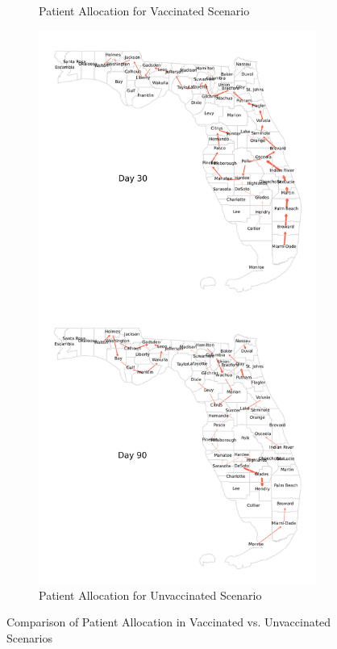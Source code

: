 \documentclass{article}
\begin{document}
\begin{figure}
\begin{subfigure}{0.445\linewidth}
        \caption{Patient Allocation for Vaccinated Scenario}\label{fig:patientAllocVax}
    \end{subfigure}
    \hspace{2em}
    \begin{subfigure}{0.445\linewidth}
        \centering
        \includegraphics[width=\linewidth]{pics/paperStackedPatientTransfersNoVax.png}
        \caption{Patient Allocation for Unvaccinated Scenario}\label{fig:patientAllocNoVax}
    \end{subfigure}
    \caption{Comparison of Patient Allocation in Vaccinated vs. Unvaccinated Scenarios}\label{fig:patientAlloc}
\end{figure}
\end{document}
